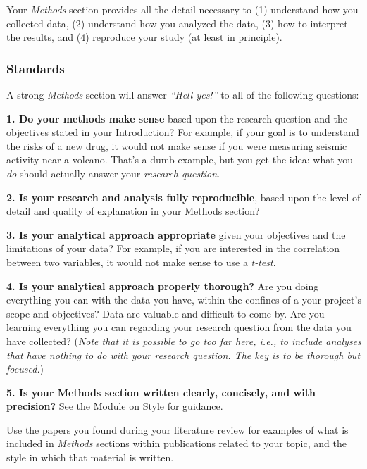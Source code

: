 \documentclass[
]{book}
\begin{document}
Your \emph{Methods} section provides all the detail necessary to (1) understand how you collected data, (2) understand how you analyzed the data, (3) how to interpret the results, and (4) reproduce your study (at least in principle).

\hypertarget{standards-2}{%
\subsubsection*{Standards}\label{standards-2}}

A strong \emph{Methods} section will answer \emph{``Hell yes!''} to all of the following questions:

\textbf{1. Do your methods make sense} based upon the research question and the objectives stated in your Introduction? For example, if your goal is to understand the risks of a new drug, it would not make sense if you were measuring seismic activity near a volcano. That's a dumb example, but you get the idea: what you \emph{do} should actually answer your \emph{research question}.

\textbf{2. Is your research and analysis fully reproducible}, based upon the level of detail and quality of explanation in your Methods section?

\textbf{3. Is your analytical approach appropriate} given your objectives and the limitations of your data? For example, if you are interested in the correlation between two variables, it would not make sense to use a \emph{t-test}.

\textbf{4. Is your analytical approach properly thorough?} Are you doing everything you can with the data you have, within the confines of a your project's scope and objectives? Data are valuable and difficult to come by. Are you learning everything you can regarding your research question from the data you have collected? (\emph{Note that it is possible to go too far here, i.e., to include analyses that have nothing to do with your research question. The key is to be thorough but focused.})

\textbf{5. Is your Methods section written clearly, concisely, and with precision?} See the \protect\hyperlink{style}{Module on Style} for guidance.

Use the papers you found during your literature review for examples of what is included in \emph{Methods} sections within publications related to your topic, and the style in which that material is written.
\end{document}
